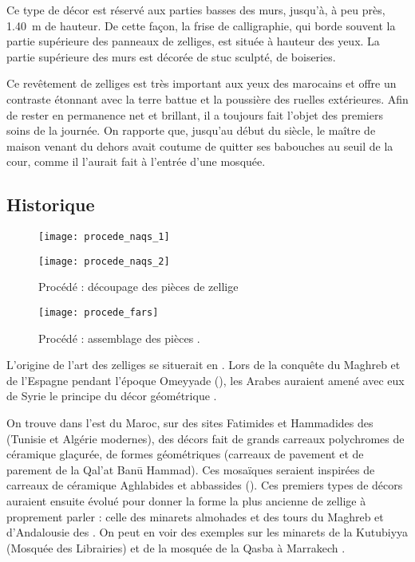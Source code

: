 Ce type de décor est réservé aux parties basses des murs, jusqu'à, 
à peu près, \SI{1.40}{\m} de hauteur. De cette façon, la frise de 
calligraphie, qui borde souvent la partie supérieure des panneaux 
de zelliges, est située à hauteur des yeux. La partie supérieure 
des murs est décorée de stuc sculpté, de boiseries.

Ce revêtement de zelliges est très important aux yeux des marocains 
et offre un contraste étonnant avec la terre battue et la poussière 
des ruelles extérieures. Afin de rester en permanence net et brillant, 
il a toujours fait l'objet des premiers soins de la journée. On 
rapporte que, jusqu'au début du siècle, le maître de maison venant du 
dehors avait coutume de quitter ses babouches au seuil de la cour, 
comme il l'aurait fait à l'entrée d'une mosquée.

\subsection{Historique}

\begin{figure}[htb]
  \begin{minipage}{0.45\textwidth}
    \centerfloat
    \texttt{[image: procede\_naqs\_1]}%

    \smallskip

    \texttt{[image: procede\_naqs\_2]}%
    \caption[Procédé \naqs : découpage des pièces de zellige]
            {Procédé \naqs : découpage des pièces de zellige 
             \autocite{Castera_1996}}
    \label{fig:procede_naqs}
  \end{minipage}%
  \hfill%
  \begin{minipage}{0.45\textwidth}
    \centerfloat
    \texttt{[image: procede\_fars]}%
    \caption{Procédé \fars : assemblage des pièces 
             \autocite{Castera_1996}.}
    \label{fig:procede_fars}
  \end{minipage}
\end{figure}

L'origine de l'art des zelliges se situerait en . 
Lors de la conquête du Maghreb et de l'Espagne pendant l'époque 
Omeyyade (), les Arabes auraient amené avec eux de 
Syrie le principe du décor géométrique \autocite{Damluji_1993a}.

On trouve dans l'est du Maroc, sur des sites Fatimides et Hammadides 
des  (Tunisie et Algérie modernes), des décors fait 
de grands carreaux polychromes de céramique glaçurée, de formes 
géométriques (carreaux de pavement et de parement de la Qal'at Ban\=u 
Hammad). Ces mosaïques seraient inspirées de carreaux de céramique 
Aghlabides et abbassides (). Ces premiers types de 
décors auraient ensuite évolué pour donner la forme la plus ancienne 
de zellige à proprement parler : celle des minarets almohades et des 
tours du Maghreb et d'Andalousie des . On peut en 
voir des exemples  sur les 
minarets de la Kutubiyya (Mosquée des Librairies) et de la mosquée 
de la Qasba à Marrakech \autocite{Damluji_1993a}.

